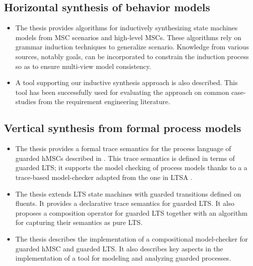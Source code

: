
\subsection{Horizontal synthesis of behavior models\label{subsection:intro-contrib-inductive-synthesis}}
\begin{itemize}
\item The thesis provides algorithms for inductively synthesizing state machines models from MSC scenarios and high-level MSCs. These algorithms rely on grammar induction techniques to generalize scenario. Knowledge from various sources, notably goals, can be incorporated to constrain the induction process so as to ensure multi-view model consistency.
\item A tool supporting our inductive synthesis approach is also described. This tool has been successfully used for evaluating the approach on common case-studies from the requirement engineering literature.
\end{itemize}


\subsection{Vertical synthesis from formal process models\label{subsection:intro-contib-supporting-process-models}}

\begin{itemize}
\item The thesis provides a formal trace semantics for the process language of guarded hMSCs described in \cite{Damas:2011}. This trace semantics is defined in terms of guarded LTS; it supports the model checking of process models thanks to a a trace-based model-checker adapted from the one in LTSA \cite{Magee:1999}. 
\item The thesis extends LTS state machines with guarded transitions defined on fluents. It provides a declarative trace semantics for guarded LTS. It also proposes a composition operator for guarded LTS together with an algorithm for capturing their semantics as pure LTS.
\item The thesis describes the implementation of a compositional model-checker for guarded hMSC and guarded LTS. It also describes key aspects in the implementation of a tool for modeling and analyzing guarded processes. 
\end{itemize}
